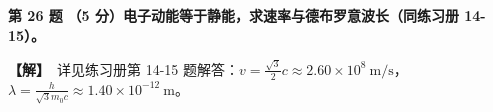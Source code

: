 \documentclass[zihao=5,a4paper,UTF8]{ctexart}
\newenvironment{prob}[2]{%
    \par\vspace{5pt}\noindent\textbf{\color{navy}#1} \textbf{#2}\par\nopagebreak\vspace{2pt}%
}{%
    \par\vspace{3pt}%
}
\newcommand{\sol}{\noindent\textbf{\color{tealaccent}【解】}\ }
\begin{document}
\begin{prob}{第 26 题}{（5 分）电子动能等于静能，求速率与德布罗意波长（同练习册 14-15）。}
\sol 详见练习册第 14-15 题解答：$v = \frac{\sqrt{3}}{2}c \approx 2.60\times 10^8\ \mathrm{m/s}$，$\lambda = \frac{h}{\sqrt{3}m_0c} \approx 1.40\times 10^{-12}\ \mathrm{m}$。
\end{prob}

\end{document}
